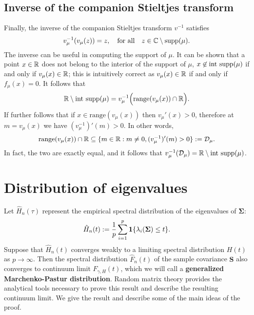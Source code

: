 \documentclass{article}
\newcommand{\bSigma}{\boldsymbol{\Sigma}}
\newcommand{\bS}{\boldsymbol{S}}
\begin{document}
\subsection{Inverse of the companion Stieltjes transform}
\label{sec:inverse-companion-transform}

Finally, the inverse of the companion Stieltjes transform $v^{-1}$ satisfies
$$
v_{\mu}^{-1}(v_{\mu}(z)) = z, \quad \textrm{for all}\quad z \in \mathbb{C}\setminus\mathrm{supp}(\mu).
$$
The inverse can be useful in computing the support of $\mu$. It can be shown that a point $x \in \mathbb{R}$ does not belong to the interior of the support of $\mu$, $x \not\in \mathrm{int}~\mathrm{supp}(\mu)$ if and only if $v_{\mu}(x) \in \mathbb{R}$; this is intuitively correct as $v_{\mu}(x) \in \mathbb{R}$ if and only if $f_{\mu}(x) = 0$. It follows that 
$$
\mathbb{R} \setminus \mathrm{int}~\mathrm{supp}(\mu) = v_{\mu}^{-1}\Big(\mathrm{range}(v_{\mu}(x)) \cap \mathbb{R}\Big).
$$
If further follows that if $x \in \mathrm{range}(v_{\mu}(x))$ then $v_{\mu}'(x) > 0$, therefore at $m = v_{\mu}(x)$ we have $(v_{\mu}^{-1})'(m) > 0$. In other words, 
$$
\mathrm{range}(v_{\mu}(x)) \cap \mathbb{R} \subseteq \{m \in \mathbb{R}: m \neq 0, (v_{\mu}^{-1})'(m) > 0 \} := \mathcal{D}_{\mu}.
$$
In fact, the two are exactly equal, and it follows that $v_{\mu}^{-1}(\mathcal{D}_{\mu}) = \mathbb{R} \setminus \mathrm{int}~\mathrm{supp}(\mu)$.

\section{Distribution of eigenvalues}
Let $\hat{H}_n(\tau)$ represent the empirical spectral distribution of the eigenvalues of $\bSigma$:
$$
\hat{H}_n(t) := \frac{1}{p} \sum_{i = 1}^{p} \1\{\lambda_i(\bSigma) \leq t\}.
$$
Suppose that $\hat{H}_n(t)$ converges weakly to a limiting spectral distribution $H(t)$ as $p \to \infty$. Then the spectral distribution $\hat{F}_n(t)$ of the sample covariance $\bS$ also converges to continuum limit $F_{\gamma,H}(t)$, which we will call a {\bf generalized Marchenko-Pastur distribution}. Random matrix theory provides the analytical tools necessary to prove this result and describe the resulting continuum limit. We give the result and describe some of the main ideas of the proof.
\end{document}
